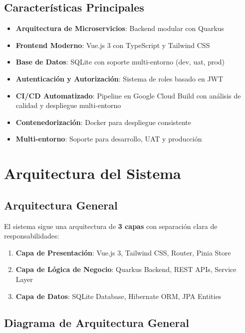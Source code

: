 \documentclass[12pt,a4paper]{article}
\begin{document}
\subsection{Características Principales}
\begin{itemize}
    \item \textbf{Arquitectura de Microservicios}: Backend modular con Quarkus
    \item \textbf{Frontend Moderno}: Vue.js 3 con TypeScript y Tailwind CSS
    \item \textbf{Base de Datos}: SQLite con soporte multi-entorno (dev, uat, prod)
    \item \textbf{Autenticación y Autorización}: Sistema de roles basado en JWT
    \item \textbf{CI/CD Automatizado}: Pipeline en Google Cloud Build con análisis de calidad y despliegue multi-entorno
    \item \textbf{Contenedorización}: Docker para despliegue consistente
    \item \textbf{Multi-entorno}: Soporte para desarrollo, UAT y producción
\end{itemize}

\section{Arquitectura del Sistema}

\subsection{Arquitectura General}

El sistema sigue una arquitectura de \textbf{3 capas} con separación clara de responsabilidades:

\begin{enumerate}
    \item \textbf{Capa de Presentación}: Vue.js 3, Tailwind CSS, Router, Pinia Store
    \item \textbf{Capa de Lógica de Negocio}: Quarkus Backend, REST APIs, Service Layer
    \item \textbf{Capa de Datos}: SQLite Database, Hibernate ORM, JPA Entities
\end{enumerate}

\subsection{Diagrama de Arquitectura General}
\end{document}
